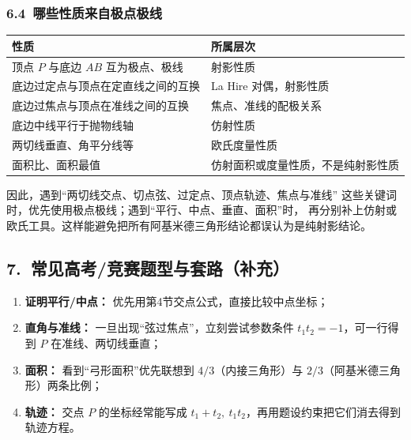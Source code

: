 \documentclass{ctexart}
\begin{document}
	\subsubsection*{6.4\ 哪些性质来自极点极线}

	\begin{center}
		\begin{tabular}{p{}p{}}
			\toprule
			性质 & 所属层次 \\ \midrule
			顶点 $P$ 与底边 $AB$ 互为极点、极线 & 射影性质 \\
			底边过定点与顶点在定直线之间的互换 & La Hire 对偶，射影性质 \\
			底边过焦点与顶点在准线之间的互换 & 焦点、准线的配极关系 \\
			底边中线平行于抛物线轴 & 仿射性质 \\
			两切线垂直、角平分线等 & 欧氏度量性质 \\
			面积比、面积最值 & 仿射面积或度量性质，不是纯射影性质 \\
			\bottomrule
		\end{tabular}
	\end{center}

	因此，遇到``两切线交点、切点弦、过定点、顶点轨迹、焦点与准线''
	这些关键词时，优先使用极点极线；遇到``平行、中点、垂直、面积''时，
	再分别补上仿射或欧氏工具。这样能避免把所有阿基米德三角形结论都误认为是纯射影结论。
	
	\subsection*{7.\ 常见高考/竞赛题型与套路（补充）}
	\begin{enumerate}
		\item \textbf{证明平行/中点：} 优先用第4节交点公式，直接比较中点坐标；
		\item \textbf{直角与准线：} 一旦出现“弦过焦点”，立刻尝试参数条件 $t_1t_2=-1$，可一行得到 $P$ 在准线、两切线垂直；
		\item \textbf{面积：} 看到“弓形面积”优先联想到 $4/3$（内接三角形）与 $2/3$（阿基米德三角形）两条比例；
		\item \textbf{轨迹：} 交点 $P$ 的坐标经常能写成 $t_1+t_2,\ t_1t_2$，再用题设约束把它们消去得到轨迹方程。
	\end{enumerate}
	
\end{document}
